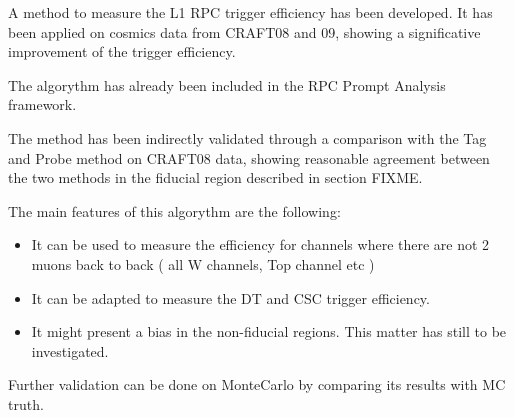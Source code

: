 
A method to measure the L1 RPC trigger efficiency has been developed.
It has been applied on cosmics data from CRAFT08 and 09, showing a significative 
improvement of the trigger efficiency.

The algorythm has already been included in the RPC Prompt Analysis framework.




The method has been indirectly validated
 through a comparison with the Tag and Probe 
method on CRAFT08 data, showing reasonable 
agreement between the two methods in the fiducial 
region described in section FIXME.


The main features of this algorythm are the following:

\begin{itemize} 
\item It can be used to measure the efficiency for channels
 where there are not 2 muons back to back ( all W channels, Top channel etc )
\item It can be adapted to measure the DT and CSC trigger efficiency.
\item It might present a bias in the non-fiducial regions. This matter has still 
to be investigated.
\end{itemize} 


Further validation can be done on MonteCarlo by comparing its 
results with MC truth.



%

